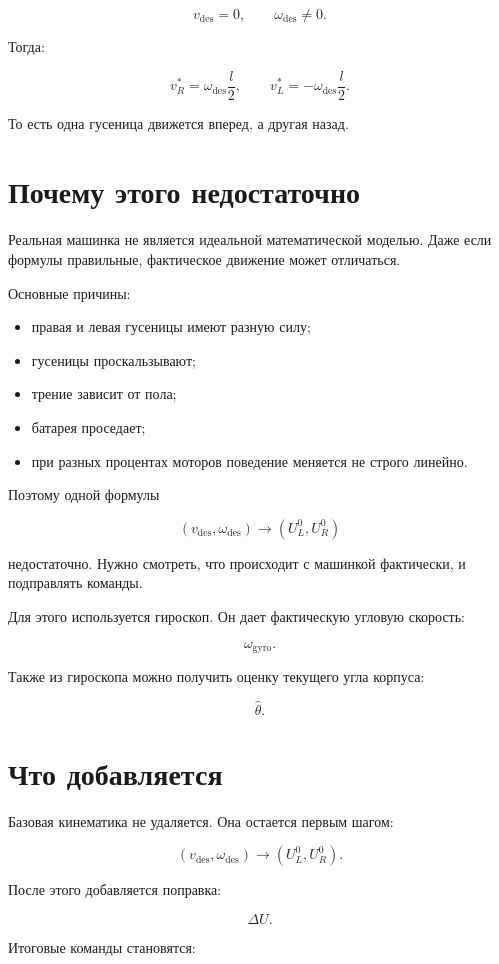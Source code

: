 \documentclass[12pt,a4paper]{article}
\newcommand{\vdes}{v_{\mathrm{des}}}
\newcommand{\wdes}{\omega_{\mathrm{des}}}
\newcommand{\wgyro}{\omega_{\mathrm{gyro}}}
\newcommand{\thetahat}{\hat{\theta}}
\begin{document}
\[
\vdes = 0,
\qquad
\wdes \ne 0.
\]

Тогда:

\[
v_R^* = \wdes \frac{l}{2},
\qquad
v_L^* = -\wdes \frac{l}{2}.
\]

То есть одна гусеница движется вперед, а другая назад.

\section{Почему этого недостаточно}

Реальная машинка не является идеальной математической моделью. Даже если
формулы правильные, фактическое движение может отличаться.

Основные причины:

\begin{itemize}
  \item правая и левая гусеницы имеют разную силу;
  \item гусеницы проскальзывают;
  \item трение зависит от пола;
  \item батарея проседает;
  \item при разных процентах моторов поведение меняется не строго линейно.
\end{itemize}

Поэтому одной формулы

\[
(\vdes,\wdes) \longrightarrow (U_L^0,U_R^0)
\]

недостаточно. Нужно смотреть, что происходит с машинкой фактически, и
подправлять команды.

Для этого используется гироскоп. Он дает фактическую угловую скорость:

\[
\wgyro.
\]

Также из гироскопа можно получить оценку текущего угла корпуса:

\[
\thetahat.
\]

\section{Что добавляется}

Базовая кинематика не удаляется. Она остается первым шагом:

\[
(\vdes,\wdes)
\longrightarrow
(U_L^0,U_R^0).
\]

После этого добавляется поправка:

\[
\Delta U.
\]

Итоговые команды становятся:
\end{document}
